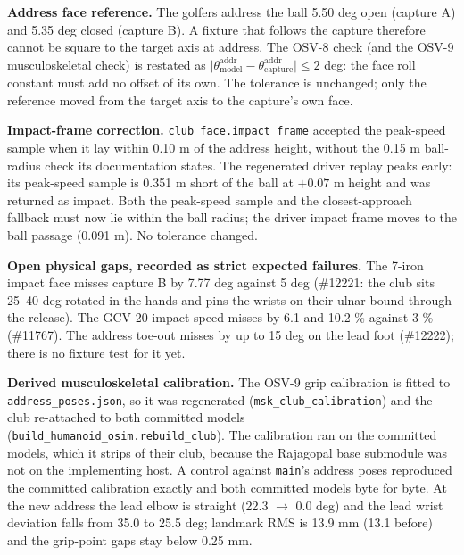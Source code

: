 \documentclass[11pt,a4paper]{article}
\begin{document}
\textbf{Address face reference.} The golfers address the ball 5.50 deg open
(capture A) and 5.35 deg closed (capture B). A fixture that follows the
capture therefore cannot be square to the target axis at address. The OSV-8
check (and the OSV-9 musculoskeletal check) is restated as
$\lvert\theta_{\mathrm{model}}^{\mathrm{addr}} -
\theta_{\mathrm{capture}}^{\mathrm{addr}}\rvert \le 2$ deg: the face roll
constant must add no offset of its own. The tolerance is unchanged; only the
reference moved from the target axis to the capture's own face.

\textbf{Impact-frame correction.} \texttt{club\_face.impact\_frame} accepted
the peak-speed sample when it lay within 0.10 m of the address height, without
the 0.15 m ball-radius check its documentation states. The regenerated driver
replay peaks early: its peak-speed sample is 0.351 m short of the ball at
$+0.07$ m height and was returned as impact. Both the peak-speed sample and
the closest-approach fallback must now lie within the ball radius; the driver
impact frame moves to the ball passage (0.091 m). No tolerance changed.

\textbf{Open physical gaps, recorded as strict expected failures.} The
7-iron impact face misses capture B by 7.77 deg against 5 deg
(\#12221: the club sits 25--40 deg rotated in the hands and pins the wrists on
their ulnar bound through the release). The GCV-20 impact speed misses by
6.1 and 10.2 \% against 3 \% (\#11767). The address toe-out misses by up to
15 deg on the lead foot (\#12222); there is no fixture test for it yet.

\textbf{Derived musculoskeletal calibration.} The OSV-9 grip calibration is
fitted to \texttt{address\_poses.json}, so it was regenerated
(\texttt{msk\_club\_calibration}) and the club re-attached to both committed
models (\texttt{build\_humanoid\_osim.rebuild\_club}). The calibration ran on
the committed models, which it strips of their club, because the Rajagopal
base submodule was not on the implementing host. A control against
\texttt{main}'s address poses reproduced the committed calibration exactly and
both committed models byte for byte. At the new address the lead elbow is
straight (22.3 $\rightarrow$ 0.0 deg) and the lead wrist deviation falls from
35.0 to 25.5 deg; landmark RMS is 13.9 mm (13.1 before) and the grip-point
gaps stay below 0.25 mm.
\end{document}
